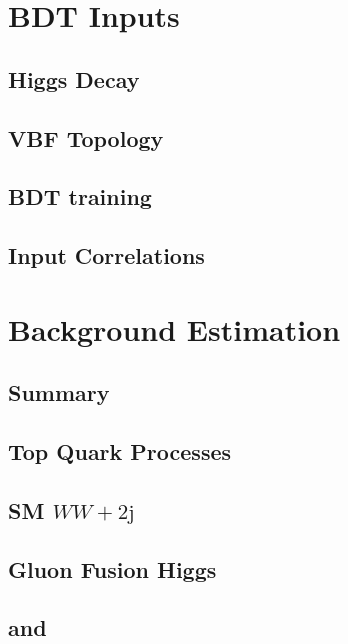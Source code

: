 \section{BDT Inputs}

\subsection{Higgs Decay}

\subsection{VBF Topology}

\subsection{BDT training}

\subsection{Input Correlations}

\section{Background Estimation}

\subsection{Summary}

%

\subsection{Top Quark Processes}

%

\subsection{SM $WW+2\textrm{j}$}



\subsection{Gluon Fusion Higgs}

\subsection{\ZDYll and \Ztautau}

